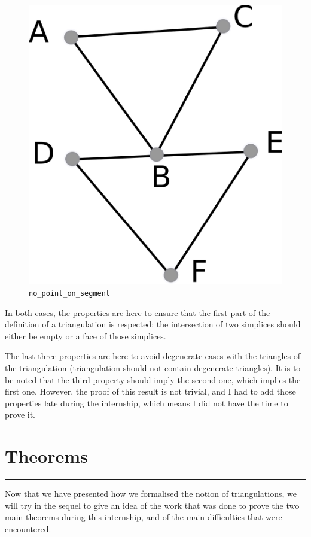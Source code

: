 \documentclass[a4paper,10pt]{article}
\begin{document}
\begin{enumerate}
\begin{figure}
\includegraphics[scale=2]{nps}
\caption{\label{nps} {\tt no\_point\_on\_segment}}
\end{figure}
\end{enumerate}
In both cases, the properties are here to ensure that the first part of the definition of a triangulation is respected: the intersection of two simplices should either be empty or a face of those simplices.

The last three properties are here to avoid degenerate cases with the triangles of the triangulation (triangulation should not contain degenerate triangles). It is to be noted that the third property should imply the second one, which implies the first one. However, the proof of this result is not trivial, and I had to add those properties late during the internship, which means I did not have the time to prove it.




\section{Theorems}
\rule{\linewidth}{0.5pt}
\label{theorems}

Now that we have presented how we formalised the notion of triangulations, we will try in the sequel to give an idea of the work that was done to prove the two main theorems during this internship, and of the main difficulties that were encountered.
\end{document}
